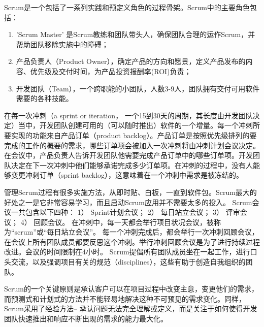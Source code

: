 Scrum是一个包括了一系列实践和预定义角色的过程骨架。Scrum中的主要角色包括：
\begin{enumerate}
\item 'Scrum Master' 是Scrum教练和团队带头人，确保团队合理的运作Scrum，并帮助团队移除实施中的障碍；
\item 产品负责人（Product Owner），确定产品的方向和愿景，定义产品发布的内容、优先级及交付时间，为产品投资报酬率(ROI)负责；
\item 开发团队（Team），一个跨职能的小团队，人数3-9人，团队拥有交付可用软件需要的各种技能。
\end{enumerate}

在每一次冲刺（a sprint or iteration， 一个15到30天的周期，其长度由开发团队决定）当中，开发团队创建可用的（可以随时推出）软件的一个增量。每一个冲刺所要实现的功能来自产品订单（product backlog）。产品订单是按照优先级排列的要完成的工作的概要的需求，哪些订单项会被加入一次冲刺将由冲刺计划会议决定。 在会议中，产品负责人告诉开发团队他需要完成产品订单中的哪些订单项。开发团队决定在下一次冲刺中他们能够承诺完成多少订单项。在冲刺的过程中，没有人能够变更冲刺订单（sprint backlog），这意味着在一个冲刺中需求是被冻结的。

管理Scrum过程有很多实施方法，从即时贴、白板，一直到软件包。Scrum最大的好处之一是它非常容易学习，而且启动Scrum应用并不需要太多的投入。
Scrum会议一共包含以下四种： 1） Sprint计划会议； 2） 每日站立会议； 3） 评审会议； 4） 回顾会议。
在冲刺中，每一天都会举行项目状况会议，被称为“scrum”或“每日站立会议”。
每一个冲刺完成后，都会举行一次冲刺回顾会议，在会议上所有团队成员都要反思这个冲刺。举行冲刺回顾会议是为了进行持续过程改进。会议的时间限制在4小时。
Scrum提倡所有团队成员坐在一起工作，进行口头交流，以及强调项目有关的规范（disciplines），这些有助于创造自我组织的团队。

Scrum的一个关键原则是承认客户可以在项目过程中改变主意，变更他们的需求，而预测式和计划式的方法并不能轻易地解决这种不可预见的需求变化。同样，Scrum采用了经验方法– 承认问题无法完全理解或定义，而是关注于如何使得开发团队快速推出和响应不断出现的需求的能力最大化。










\clearpage